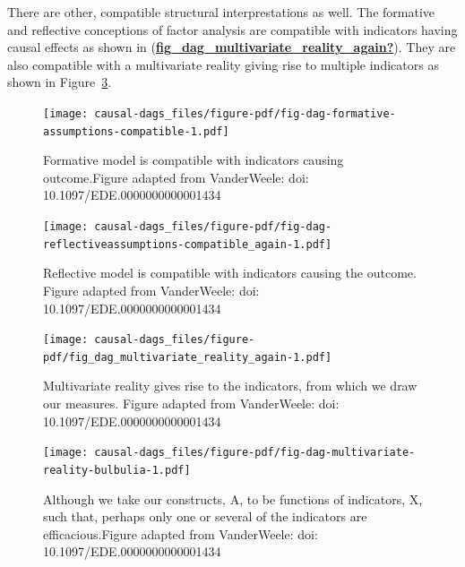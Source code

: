 \documentclass[
  singlecolumn]{report}
\begin{document}
There are other, compatible structural interprestations as well. The
formative and reflective conceptions of factor analysis are compatible
with indicators having causal effects as shown in
(\protect\hyperlink{ref-fig_dag_multivariate_reality_again}{\textbf{fig\_dag\_multivariate\_reality\_again?}}).
They are also compatible with a multivariate reality giving rise to
multiple indicators as shown in
Figure~\ref{fig-dag-multivariate-reality-bulbulia}.

\begin{figure}

{\centering \texttt{[image: causal-dags\_files/figure-pdf/fig-dag-formative-assumptions-compatible-1.pdf]}

}

\caption{\label{fig-dag-formative-assumptions-compatible}Formative model
is compatible with indicators causing outcome.Figure adapted from
VanderWeele: doi: 10.1097/EDE.0000000000001434}

\end{figure}

\begin{figure}

{\centering \texttt{[image: causal-dags\_files/figure-pdf/fig-dag-reflectiveassumptions-compatible\_again-1.pdf]}

}

\caption{\label{fig-dag-reflectiveassumptions-compatible_again}Reflective
model is compatible with indicators causing the outcome. Figure adapted
from VanderWeele: doi: 10.1097/EDE.0000000000001434}

\end{figure}

\begin{figure}

{\centering \texttt{[image: causal-dags\_files/figure-pdf/fig\_dag\_multivariate\_reality\_again-1.pdf]}

}

\caption{Multivariate reality gives rise to the indicators, from which
we draw our measures. Figure adapted from VanderWeele: doi:
10.1097/EDE.0000000000001434}

\end{figure}

\begin{figure}

{\centering \texttt{[image: causal-dags\_files/figure-pdf/fig-dag-multivariate-reality-bulbulia-1.pdf]}

}

\caption{\label{fig-dag-multivariate-reality-bulbulia}Although we take
our constructs, A, to be functions of indicators, X, such that, perhaps
only one or several of the indicators are efficacious.Figure adapted
from VanderWeele: doi: 10.1097/EDE.0000000000001434}

\end{figure}
\end{document}

